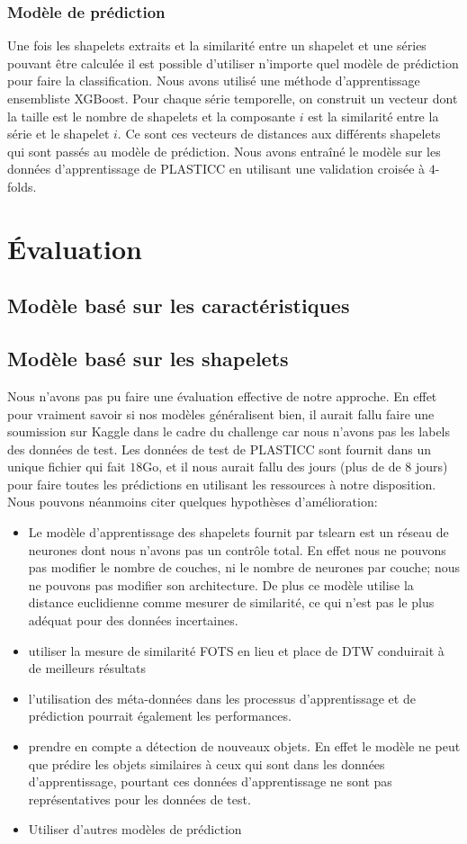 \subsubsection{Modèle de prédiction}
Une fois les shapelets extraits et la similarité entre un shapelet et une séries pouvant être calculée il est possible d'utiliser n'importe quel modèle de prédiction pour faire la classification. Nous avons utilisé une méthode d'apprentissage ensembliste XGBoost\cite{chen2016xgboost}. Pour chaque série temporelle, on construit un vecteur dont la taille est le nombre de shapelets et la composante $ i $ est la similarité entre la série et le shapelet $ i $. Ce sont ces vecteurs de distances aux différents shapelets qui sont passés au modèle de prédiction. Nous avons entraîné le modèle sur les données d'apprentissage de PLASTICC en utilisant une validation croisée à $ 4 $-folds.

\section{Évaluation}
\subsection{Modèle basé sur les caractéristiques}

\subsection{Modèle basé sur les shapelets}
Nous n'avons pas pu faire une évaluation effective de notre approche. En effet pour vraiment savoir si nos modèles généralisent bien, il aurait fallu faire une soumission sur Kaggle dans le cadre du challenge car nous n'avons pas les labels des données de test. Les données de test de PLASTICC sont fournit dans un unique fichier qui fait $ 18$Go, et il nous aurait fallu des jours (plus de de 8 jours) pour faire toutes les prédictions en utilisant les ressources à notre disposition. Nous pouvons néanmoins citer quelques hypothèses d'amélioration:
\begin{itemize}
    \item Le modèle d'apprentissage des shapelets fournit par tslearn est un réseau de neurones dont nous n'avons pas un contrôle total. En effet nous ne pouvons pas modifier le nombre de couches, ni le nombre de neurones par couche; nous ne pouvons pas modifier son architecture. De plus ce modèle utilise la distance euclidienne comme mesurer de similarité, ce qui n'est pas le plus adéquat pour des données incertaines.
    \item utiliser la mesure de similarité FOTS en lieu et place de DTW conduirait à de meilleurs résultats
    \item l'utilisation des méta-données dans les processus d'apprentissage et de prédiction pourrait également les performances.
    \item prendre en compte a détection de nouveaux objets. En effet le modèle ne peut que prédire les objets similaires à ceux qui sont dans les données d'apprentissage, pourtant ces données d'apprentissage ne sont pas représentatives pour les données de test.
    \item Utiliser d'autres modèles de prédiction
\end{itemize}